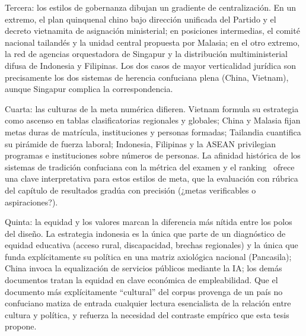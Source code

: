 Tercera: los estilos de gobernanza dibujan un gradiente de centralización. En un extremo, el plan quinquenal chino bajo dirección unificada del Partido y el decreto vietnamita de asignación ministerial; en posiciones intermedias, el comité nacional tailandés y la unidad central propuesta por Malasia; en el otro extremo, la red de agencias orquestadora de Singapur y la distribución multiministerial difusa de Indonesia y Filipinas. Los dos casos de mayor verticalidad jurídica son precisamente los dos sistemas de herencia confuciana plena (China, Vietnam), aunque Singapur complica la correspondencia.

Cuarta: las culturas de la meta numérica difieren. Vietnam formula su estrategia como ascenso en tablas clasificatorias regionales y globales; China y Malasia fijan metas duras de matrícula, instituciones y personas formadas; Tailandia cuantifica su pirámide de fuerza laboral; Indonesia, Filipinas y la ASEAN privilegian programas e instituciones sobre números de personas. La afinidad histórica de los sistemas de tradición confuciana con la métrica del examen y el ranking~\citep{suen2006chronic} ofrece una clave interpretativa para estos estilos de meta, que la evaluación con rúbrica del capítulo de resultados gradúa con precisión (¿metas verificables o aspiraciones?).

Quinta: la equidad y los valores marcan la diferencia más nítida entre los polos del diseño. La estrategia indonesia es la única que parte de un diagnóstico de equidad educativa (acceso rural, discapacidad, brechas regionales) y la única que funda explícitamente su política en una matriz axiológica nacional (Pancasila); China invoca la equalización de servicios públicos mediante la IA; los demás documentos tratan la equidad en clave económica de empleabilidad. Que el documento más explícitamente ``cultural'' del corpus provenga de un país no confuciano matiza de entrada cualquier lectura esencialista de la relación entre cultura y política, y refuerza la necesidad del contraste empírico que esta tesis propone.
